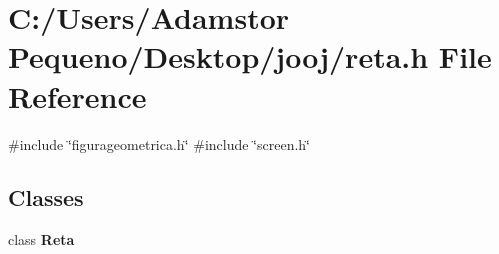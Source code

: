 \section{C\+:/\+Users/\+Adamstor Pequeno/\+Desktop/jooj/reta.h File Reference}
\label{reta_8h}
{\ttfamily \#include \char`\"{}figurageometrica.\+h\char`\"{}}\newline
{\ttfamily \#include \char`\"{}screen.\+h\char`\"{}}\newline
\subsection*{Classes}
\begin{DoxyCompactItemize}
\item 
class \textbf{ Reta}
\end{DoxyCompactItemize}
